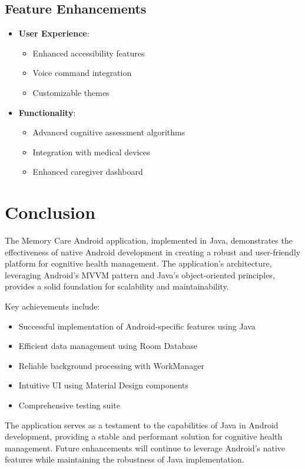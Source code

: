 \section{Feature Enhancements}
\begin{itemize}
    \item \textbf{User Experience}:
    \begin{itemize}
        \item Enhanced accessibility features
        \item Voice command integration
        \item Customizable themes
    \end{itemize}
    
    \item \textbf{Functionality}:
    \begin{itemize}
        \item Advanced cognitive assessment algorithms
        \item Integration with medical devices
        \item Enhanced caregiver dashboard
    \end{itemize}
\end{itemize}

\chapter{Conclusion}
The Memory Care Android application, implemented in Java, demonstrates the effectiveness of native Android development in creating a robust and user-friendly platform for cognitive health management. The application's architecture, leveraging Android's MVVM pattern and Java's object-oriented principles, provides a solid foundation for scalability and maintainability.

Key achievements include:
\begin{itemize}
    \item Successful implementation of Android-specific features using Java
    \item Efficient data management using Room Database
    \item Reliable background processing with WorkManager
    \item Intuitive UI using Material Design components
    \item Comprehensive testing suite
\end{itemize}

The application serves as a testament to the capabilities of Java in Android development, providing a stable and performant solution for cognitive health management. Future enhancements will continue to leverage Android's native features while maintaining the robustness of Java implementation.

